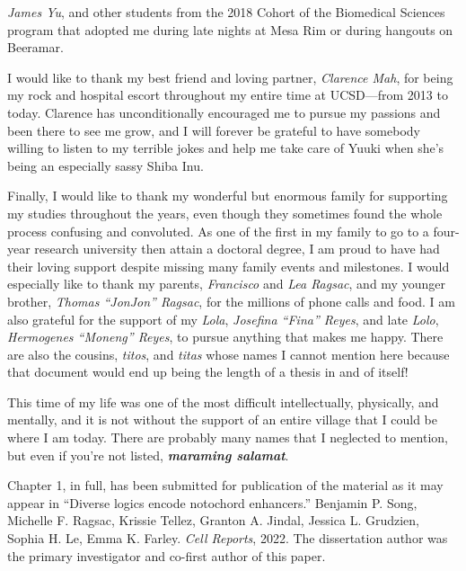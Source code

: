\documentclass[11pt]{formatting-template}
\begin{document}
\begin{acknowledgements}
\textit{James Yu}, and other students from the 2018 Cohort of the Biomedical Sciences program that adopted me during late nights at Mesa Rim or during hangouts on Beeramar. 
	
	I would like to thank my best friend and loving partner, \textit{Clarence Mah}, for being my rock and hospital escort throughout my entire time at UCSD—from 2013 to today. Clarence has unconditionally encouraged me to pursue my passions and been there to see me grow, and I will forever be grateful to have somebody willing to listen to my terrible jokes and help me take care of Yuuki when she's being an especially sassy Shiba Inu. 
	
	Finally, I would like to thank my wonderful but enormous family for supporting my studies throughout the years, even though they sometimes found the whole process confusing and convoluted. As one of the first in my family to go to a four-year research university then attain a doctoral degree, I am proud to have had their loving support despite missing many family events and milestones. I would especially like to thank my parents, \textit{Francisco} and \textit{Lea Ragsac}, and my younger brother, \textit{Thomas “JonJon” Ragsac}, for the millions of phone calls and food. I am also grateful for the support of my \textit{Lola}, \textit{Josefina “Fina” Reyes}, and late \textit{Lolo}, \textit{Hermogenes “Moneng” Reyes}, to pursue anything that makes me happy. There are also the cousins, \textit{titos}, and \textit{titas} whose names I cannot mention here because that document would end up being the length of a thesis in and of itself! 
	
	This time of my life was one of the most difficult intellectually, physically, and mentally, and it is not without the support of an entire village that I could be where I am today. There are probably many names that I neglected to mention, but even if you're not listed, \textbf{\textit{maraming salamat}}.
	
	Chapter 1, in full, has been submitted for publication of the material as it may appear in “Diverse logics encode notochord enhancers.” Benjamin P. Song, Michelle F. Ragsac, Krissie Tellez, Granton A. Jindal, Jessica L. Grudzien, Sophia H. Le, Emma K. Farley. \textit{Cell Reports}, 2022. The dissertation author was the primary investigator and co-first author of this paper.
\end{acknowledgements}
\end{document}

